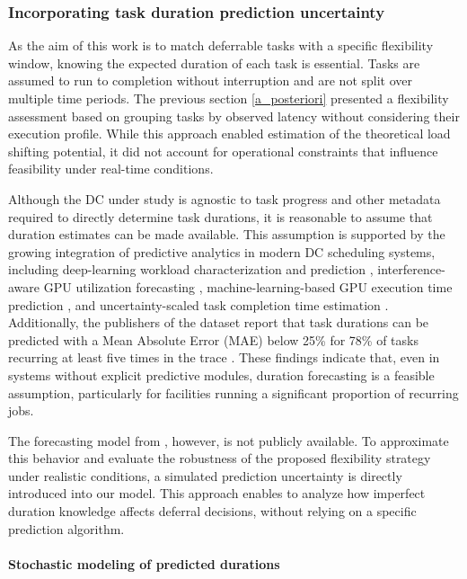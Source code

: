 \documentclass[preprint,12pt]{elsarticle}
\begin{document}
\subsubsection{Incorporating task duration prediction uncertainty} \label{prediction_uncertainty_methods}
As the aim of this work is to match deferrable tasks with a specific flexibility window, knowing the expected duration of each task is essential. Tasks are assumed to run to completion without interruption and are not split over multiple time periods. 
The previous section \ref{a_posteriori} presented a flexibility assessment based on grouping tasks by observed latency without considering their execution profile. While this approach enabled estimation of the theoretical load shifting potential, it did not account for operational constraints that influence feasibility under real-time conditions.

Although the DC under study is agnostic to task progress and other metadata required to directly determine task durations, it is reasonable to assume that duration estimates can be made available. This assumption is supported by the growing integration of predictive analytics in modern DC scheduling systems, including deep-learning workload characterization and prediction \cite{Hu2021}, interference-aware GPU utilization forecasting \cite{Yeung2022}, machine-learning-based GPU execution time prediction \cite{Amaris2016}, and uncertainty-scaled task completion time estimation \cite{Kawaguchi2024}. Additionally, the publishers of the dataset report that task durations can be predicted with a %
Mean Absolute Error (MAE) below 25\% for 78\% of tasks recurring at least five times in the trace \cite{Weng2022}. These findings indicate that, even in systems without explicit predictive modules, duration forecasting is a feasible assumption, particularly for facilities running a significant proportion of recurring jobs.

The forecasting model from \cite{Weng2022}, however, is not publicly available. To approximate this behavior and evaluate the robustness of the proposed flexibility strategy under realistic conditions, a simulated prediction uncertainty is directly introduced into our model. This approach enables to analyze how imperfect duration knowledge affects deferral decisions, without relying on a specific prediction algorithm.

\paragraph{Stochastic modeling of predicted durations}
\end{document}
